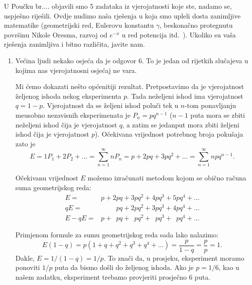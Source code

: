 \documentclass{ppclanak}
\begin{document}
	



%

U Pou\v{c}ku br.... objavili smo 5 zadataka iz
vjerojatnosti koje ste, nadamo se, uspje\v{s}no rije\v{s}ili.
Ovdje nudimo na\v{s}a rje\v{s}enja u koja smo upleli dosta
zanimljive matematike (geometrijski red, Eulerovu konstantu
$\gamma$, beskona\v{c}no protegnutu povr\v{s}inu Nikole Oresma,
razvoj od $e^{-x}$ u red potencija itd.~). Ukoliko su va\v{s}a
rje\v{s}enja zanimljiva i bitno razli\v{c}ita, javite nam.

\begin{enumerate}
\item Ve\'{c}ina ljudi nekako osje\'{c}a da je odgovor 6. To je
jedan od rijetkih slu\v{c}ajeva u kojima nas vjerojatnosni
osje\'{c}aj ne vara.

Mi \'{c}emo dokazati ne\v{s}to op\'{c}enitiji rezultat.
Pretpostavimo da je vjerojatnost \v{z}eljenog ishoda nekog
eksperimenta $p$. Tada ne\v{z}eljeni ishod ima vjerojatnost
$q=1-p$. Vjerojatnost da se \v{z}eljeni ishod polu\v{c}i tek u
$n$-tom ponavljanju me\dj usobno nezavisnih eksperimenata je
$P_n=pq^{n-1}$ ($n-1$ puta mora se zbiti ne\v{z}eljeni ishod
\v{c}ija je vjerojatnost $q$, a zatim se jedanput mora zbiti
\v{z}eljeni ishod \v{c}ija je vjerojatnost $p$). O\v{c}ekivana
vrijednost potrebnog broja poku\v{s}aja zato je
\[ E= 1P_1 +  2P_2 + \ldots =\sum _{n=1}^{\infty} nP_n= p + 2pq + 3pq^2 + \ldots = \sum _{n=1}^{\infty}npq^{n-1} .\]

O\v{c}ekivanu vrijednost $E$ mo\v{z}emo izra\v{c}unati metodom
kojom se obi\v{c}no ra\v{c}una suma geometrijskog reda:
\begin{align*}
E =& p + 2pq + 3pq^2 + 4pq^3 + 5pq^4 + \ldots\\
qE =& \;\;\;\;\;\;\;\; pq + 2pq^2 + 3pq^3 + 4pq^4 + \ldots\\
E - qE=& p + \;\: pq + \;\: pq^2 + \;\: pq^3 + \;\: pq^4 + \ldots
\end{align*}

Primjenom formule za sumu geometrijskog reda sada lako nalazimo:
\[ E(1-q)=p(1+q +q^2 +q^3 + q^4 + \ldots) = \frac{p}{1-q} = \frac{p}{p}=1 . \]
Dakle, $E=1/(1-q)=1/p$. To zna\v{c}i da, u prosjeku, eksperiment
moramo ponoviti $1/p$ puta da bismo do\v{s}li do \v{z}eljenog
ishoda. Ako je $p=1/6$, kao u na\v{s}em zadatku, eksperiment
trebamo provjeriti prosje\v{c}no $6$ puta.


\end{enumerate}
\end{document}

